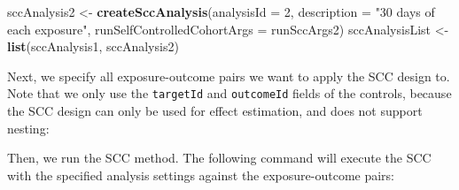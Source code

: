 \documentclass[]{article}
\newenvironment{Shaded}{\begin{snugshade}}{\end{snugshade}}
\newcommand{\ControlFlowTok}[1]{\textcolor[rgb]{0.13,0.29,0.53}{\textbf{#1}}}
\newcommand{\DataTypeTok}[1]{\textcolor[rgb]{0.13,0.29,0.53}{#1}}
\newcommand{\DecValTok}[1]{\textcolor[rgb]{0.00,0.00,0.81}{#1}}
\newcommand{\KeywordTok}[1]{\textcolor[rgb]{0.13,0.29,0.53}{\textbf{#1}}}
\newcommand{\NormalTok}[1]{#1}
\newcommand{\OperatorTok}[1]{\textcolor[rgb]{0.81,0.36,0.00}{\textbf{#1}}}
\newcommand{\StringTok}[1]{\textcolor[rgb]{0.31,0.60,0.02}{#1}}
\begin{document}
\begin{Shaded}
\begin{Highlighting}[]
\NormalTok{sccAnalysis2 <-}\StringTok{ }\KeywordTok{createSccAnalysis}\NormalTok{(}\DataTypeTok{analysisId =} \DecValTok{2}\NormalTok{,}
                                  \DataTypeTok{description =} \StringTok{"30 days of each exposure"}\NormalTok{,}
                                  \DataTypeTok{runSelfControlledCohortArgs =}\NormalTok{ runSccArgs2)}
\NormalTok{sccAnalysisList <-}\StringTok{ }\KeywordTok{list}\NormalTok{(sccAnalysis1, sccAnalysis2)}
\end{Highlighting}
\end{Shaded}

Next, we specify all exposure-outcome pairs we want to apply the SCC
design to. Note that we only use the \texttt{targetId} and
\texttt{outcomeId} fields of the controls, because the SCC design can
only be used for effect estimation, and does not support nesting:

\begin{Shaded}
\end{Shaded}

Then, we run the SCC method. The following command will execute the SCC
with the specified analysis settings against the exposure-outcome pairs:
\end{document}
